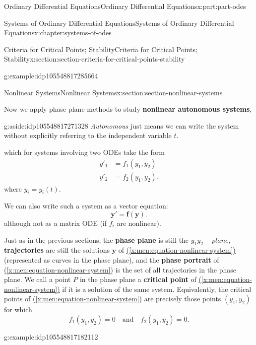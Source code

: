\documentclass[twoside,10pt,]{book}
\newcommand{\xreffont}{\relax}
\newcommand{\terminology}[1]{\textbf{#1}}
\numberwithin{equation}{part}
\renewcommand{\vec}[1]{\mathbf{#1}}
\newcommand{\amp}{&}
\begin{document}
\begin{partptx}{Ordinary Differential Equations}{}{Ordinary Differential Equations}{}{}{x:part:part-odes}
\begin{chapterptx}{Systems of Ordinary Differential Equations}{}{Systems of Ordinary Differential Equations}{}{}{x:chapter:systems-of-odes}
\begin{sectionptx}{Criteria for Critical Points; Stability}{}{Criteria for Critical Points; Stability}{}{}{x:section:section-criteria-for-critical-points-stability}
\begin{example}{}{g:example:idp105548817285664}
\end{example}
\end{sectionptx}
%
%
\typeout{************************************************}
\typeout{************************************************}
%
\begin{sectionptx}{Nonlinear Systems}{}{Nonlinear Systems}{}{}{x:section:section-nonlinear-systems}
\begin{introduction}{}%
Now we apply phase plane methods to study \terminology{nonlinear autonomous systems}, \begin{aside}{}{g:aside:idp105548817271328}%
\emph{Autonomous} just means we can write the system without explicitly referring to the independent variable \(t\).%
\end{aside}
 which for systems involving two ODEs take the form%
\begin{align*}
y'_{1} \amp = f_{1}(y_{1},y_{2})\\
y'_{2} \amp = f_{2}(y_{1},y_{2})\text{.}
\end{align*}
where \(y_{i} = y_{i}(t)\).%
\par
We can also write such a system as a vector equation:%
\begin{equation}
\vec{y}' = \vec{f}(\vec{y})\text{.}\label{x:men:equation-nonlinear-system}
\end{equation}
although not as a matrix ODE (if \(f_{i}\) are nonlinear).%
\par
Just as in the previous sections, the \terminology{phase plane} is still the \(y_{1}y_{2}-plane\), \terminology{trajectories} are still the solutions \(\vec{y}\) of \hyperref[x:men:equation-nonlinear-system]{({\xreffont\ref{x:men:equation-nonlinear-system}})} (represented as curves in the phase plane), and the \terminology{phase portrait} of \hyperref[x:men:equation-nonlinear-system]{({\xreffont\ref{x:men:equation-nonlinear-system}})} is the set of all trajectories in the phase plane. We call a point \(P\) in the phase plane a \terminology{critical point} of \hyperref[x:men:equation-nonlinear-system]{({\xreffont\ref{x:men:equation-nonlinear-system}})} if it is a solution of the same system. Equivalently, the critical points of \hyperref[x:men:equation-nonlinear-system]{({\xreffont\ref{x:men:equation-nonlinear-system}})} are precisely those points \((y_{1},y_{2})\) for which%
\begin{equation*}
f_{1}(y_{1},y_{2}) = 0\quad\text{and}\quad f_{2}(y_{1},y_{2}) = 0.  
\end{equation*}
%
\begin{example}{}{g:example:idp105548817182112}%

\end{example}
\end{introduction}
\end{sectionptx}
\end{chapterptx}
\end{partptx}
\end{document}
